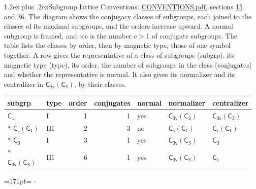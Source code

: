 \documentclass[10pt,a4paper]{article}
\makeatletter
\renewcommand\section{\@startsection{section}{1}{\z@}{-3ex plus -1ex minus -.2ex}%
  {1.2ex plus .2ex}{\normalfont\large\sffamily\bfseries\color{parttitle}}}
\newcommand{\needspace}[1]{\par\penalty-100\begingroup\dimen0=#1\relax\dimen2=\pagegoal
  \advance\dimen2-\pagetotal\ifdim\dimen0>\dimen2\relax\ifdim\dimen2>0pt\vfil\break\fi\fi
  \endgroup}
\numberwithin{equation}{section}
\newcommand{\grp}[1]{\mathsf{#1}}
\newcommand{\nconj}[1]{{\scriptsize$\times#1$}}
\makeatother
\begin{document}
\section{Subgroup lattice}\label{s:subgroups}
Conventions: \href{../../CONVENTIONS.pdf}{CONVENTIONS.pdf}, sections \href{../../../rotation/CONVENTIONS.pdf\#conv.15}{15} and \href{../../CONVENTIONS.pdf\#conv.36}{36}.
The diagram shows the conjugacy classes of subgroups, each joined to the classes of its maximal subgroups, and the orders increase upward. \label{n:index.conjugates.c}\label{n:mark.conjugates}A normal subgroup is framed, and ${\times}c$ is the number $c > 1$ of conjugate subgroups. The table lists the classes by order, then by magnetic type, those of one symbol together. \label{n:head.subgroup}\label{n:head.magnetic.type}\label{n:head.order}\label{n:head.conjugates}\label{n:head.normal}A row gives the representative of a class of subgroups (subgrp), its magnetic type (type), its order, the number of subgroups in the class (conjugates) and whether the representative is normal. \label{n:head.normalizer}\label{n:head.centralizer}It also gives its normalizer and its centralizer in $\grp{C_{3v}}(\grp{C_{3}})$, by their classes. 
\begin{center}
\end{center}
{\small\begin{longtable}{@{}llrrlll@{}}\toprule
subgrp & type & order & conjugates & normal & normalizer & centralizer\\\midrule\endhead
\bottomrule\endfoot\endlastfoot
\href{../../../rotation/data/pdf/C1.pdf}{$\grp{C_{1}}$} & I & 1 & 1 & yes & \href{C3v-C3.pdf}{$\grp{C_{3v}}(\grp{C_{3}})$} & \href{C3v-C3.pdf}{$\grp{C_{3v}}(\grp{C_{3}})$}\\*
\href{C1v-C1.pdf}{$\grp{C_{s}}(\grp{C_{1}})$} & III & 2 & 3 & no & \href{C1v-C1.pdf}{$\grp{C_{s}}(\grp{C_{1}})$} & \href{C1v-C1.pdf}{$\grp{C_{s}}(\grp{C_{1}})$}\\*
\href{../../../rotation/data/pdf/C3.pdf}{$\grp{C_{3}}$} & I & 3 & 1 & yes & \href{C3v-C3.pdf}{$\grp{C_{3v}}(\grp{C_{3}})$} & \href{../../../rotation/data/pdf/C3.pdf}{$\grp{C_{3}}$}\\*
\href{C3v-C3.pdf}{$\grp{C_{3v}}(\grp{C_{3}})$} & III & 6 & 1 & yes & \href{C3v-C3.pdf}{$\grp{C_{3v}}(\grp{C_{3}})$} & \href{../../../rotation/data/pdf/C1.pdf}{$\grp{C_{1}}$}\\
\bottomrule\end{longtable}}
\needspace{171pt}
\end{document}
